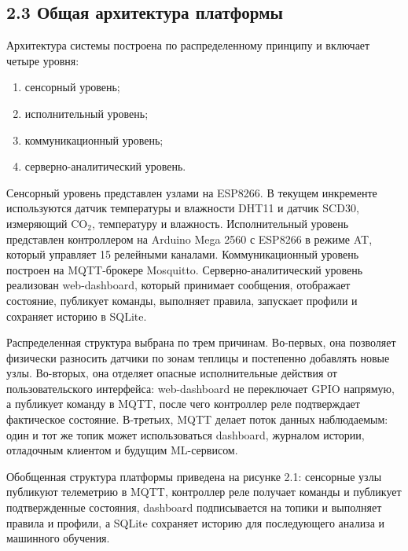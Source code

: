\documentclass[a4paper,14pt]{extarticle}
\providecommand{\tightlist}{%
  \setlength{\itemsep}{0pt}\setlength{\parskip}{0pt}}
\begin{document}
\hypertarget{ux43eux431ux449ux430ux44f-ux430ux440ux445ux438ux442ux435ux43aux442ux443ux440ux430-ux43fux43bux430ux442ux444ux43eux440ux43cux44b}{%
\subsection{2.3 Общая архитектура
платформы}\label{ux43eux431ux449ux430ux44f-ux430ux440ux445ux438ux442ux435ux43aux442ux443ux440ux430-ux43fux43bux430ux442ux444ux43eux440ux43cux44b}}

Архитектура системы построена по распределенному принципу и включает
четыре уровня:

\begin{enumerate}
\def\labelenumi{\arabic{enumi})}
\tightlist
\item
  сенсорный уровень;
\item
  исполнительный уровень;
\item
  коммуникационный уровень;
\item
  серверно-аналитический уровень.
\end{enumerate}

Сенсорный уровень представлен узлами на ESP8266. В текущем инкременте
используются датчик температуры и влажности DHT11 и датчик SCD30,
измеряющий CO\(_2\), температуру и влажность. Исполнительный уровень
представлен контроллером на Arduino Mega 2560 с ESP8266 в режиме AT,
который управляет 15 релейными каналами. Коммуникационный уровень
построен на MQTT-брокере Mosquitto. Серверно-аналитический уровень
реализован web-dashboard, который принимает сообщения, отображает
состояние, публикует команды, выполняет правила, запускает профили и
сохраняет историю в SQLite.

Распределенная структура выбрана по трем причинам. Во-первых, она
позволяет физически разносить датчики по зонам теплицы и постепенно
добавлять новые узлы. Во-вторых, она отделяет опасные исполнительные
действия от пользовательского интерфейса: web-dashboard не переключает
GPIO напрямую, а публикует команду в MQTT, после чего контроллер реле
подтверждает фактическое состояние. В-третьих, MQTT делает поток данных
наблюдаемым: один и тот же топик может использоваться dashboard,
журналом истории, отладочным клиентом и будущим ML-сервисом.

Обобщенная структура платформы приведена на рисунке 2.1: сенсорные узлы
публикуют телеметрию в MQTT, контроллер реле получает команды и
публикует подтвержденные состояния, dashboard подписывается на топики и
выполняет правила и профили, а SQLite сохраняет историю для последующего
анализа и машинного обучения.
\end{document}
